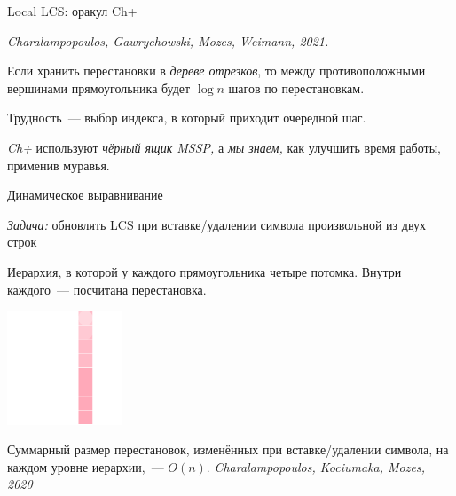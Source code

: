 \documentclass[svgnames]{beamer}
\newcommand{\flink}[1]{{\footnotesize\it\color{SkyBlue!40!White} #1}}
\begin{document}
\begin{frame}{Local LCS: оракул Ch+}

\flink{Charalampopoulos, Gawrychowski, Mozes, Weimann, 2021.} \vspace{4mm}

Если хранить перестановки в {\it дереве отрезков}, то между противоположными вершинами прямоугольника будет \(\log n\) шагов по перестановкам. \vspace{4mm}

Трудность~— выбор индекса, в который приходит очередной шаг. \vspace{4mm}

{\it Ch+} используют {\it чёрный ящик MSSP,} а {\it мы знаем,} как улучшить время работы, применив муравья. 
\end{frame}


\begin{frame}{Динамическое выравнивание}
\vspace{-7mm}

\begin{block}{\vspace*{-3ex}}
{\it Задача:} обновлять LCS при вставке/удалении символа произвольной из двух строк
\end{block}

Иерархия, в которой у каждого прямоугольника четыре потомка.
Внутри каждого~— посчитана перестановка.

\begin{center}
  \includegraphics[width=3.4cm]{svg/dynamic}
\end{center}

Суммарный размер перестановок, изменённых при вставке/удалении символа, на каждом уровне иерархии,~— \(O(n)\).
\hfill \flink{Charalampopoulos, Kociumaka, Mozes, 2020}

\end{frame}
\end{document}
